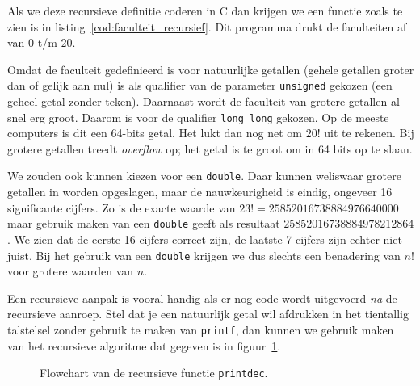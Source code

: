 Als we deze recursieve definitie coderen in C dan krijgen we een functie zoals te zien is in listing~\ref{cod:faculteit_recursief}. Dit programma drukt de faculteiten af van $0$ t/m $20$.


Omdat de faculteit gedefinieerd is voor natuurlijke getallen (gehele getallen groter dan of gelijk aan nul) is als qualifier van de parameter \texttt{unsigned} gekozen (een geheel getal zonder teken). Daarnaast wordt de faculteit van grotere getallen al snel erg groot. Daarom is voor de qualifier \texttt{long long} gekozen. Op de meeste computers is dit een 64-bits getal. Het lukt dan nog net om $20!$ uit te rekenen. Bij grotere getallen treedt \textsl{overflow} op; het getal is te groot om in 64 bits op te slaan.

We zouden ook kunnen kiezen voor een \texttt{double}. Daar kunnen weliswaar grotere getallen in worden opgeslagen, maar de nauwkeurigheid is eindig, ongeveer 16 significante cijfers.
Zo is de exacte waarde van $23! = 25852016738884976640000$ maar gebruik maken van een \texttt{double} geeft als resultaat $25852016738884978212864$. We zien dat de eerste 16 cijfers correct zijn, de laatste 7 cijfers zijn echter niet juist. Bij het gebruik van een \texttt{double} krijgen we dus slechts een benadering van $n!$ voor grotere waarden van $n$.  

Een recursieve aanpak is vooral handig als er nog code wordt uitgevoerd \emph{na} de recursieve aanroep.
Stel dat je een natuurlijk getal wil afdrukken in het tientallig talstelsel zonder gebruik te maken van \texttt{printf}, dan kunnen we gebruik maken van het recursieve algoritme dat gegeven is in figuur~\ref{fig:funprintdec}.

\begin{figure}[!ht]
\centering
{}
\caption{Flowchart van de recursieve functie \texttt{printdec}.}
\label{fig:funprintdec}
\end{figure}

